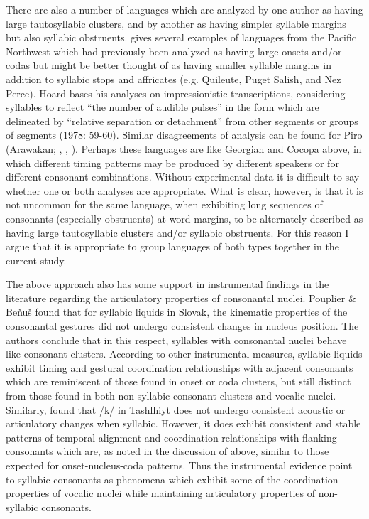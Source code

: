   There are also a number of languages which are analyzed by one author as having large tautosyllabic clusters, and by another as having simpler syllable margins but also syllabic obstruents. \citet{Hoard1978} gives several examples of languages from the Pacific Northwest which had previously been analyzed as having large onsets and/or codas but might be better thought of as having smaller syllable margins in addition to syllabic stops and affricates (e.g. Quileute, Puget Salish, and Nez Perce). Hoard bases his analyses on impressionistic transcriptions, considering syllables to reflect “the number of audible pulses” in the form which are delineated by “relative separation or detachment” from other segments or groups of segments (1978: 59-60). Similar disagreements of analysis can be found for Piro (Arawakan; \citealt{Matteson1965}, \citealt{Lin1997}, \citealt{Hanson2010}). Perhaps these languages are like Georgian and Cocopa above, in which different timing patterns may be produced by different speakers or for different consonant combinations. Without experimental data it is difficult to say whether one or both analyses are appropriate. What is clear, however, is that it is not uncommon for the same language, when exhibiting long sequences of consonants (especially obstruents) at word margins, to be alternately described as having large tautosyllabic clusters and/or syllabic obstruents. For this reason I argue that it is appropriate to group languages of both types together in the current study.



  The above approach also has some support in instrumental findings in the literature regarding the articulatory properties of consonantal nuclei. Pouplier \& Beňuš  found that for syllabic liquids in Slovak, the kinematic properties of the consonantal gestures did not undergo consistent changes in nucleus position. The authors conclude that in this respect, syllables with consonantal nuclei behave like consonant clusters. According to other instrumental measures, syllabic liquids exhibit timing and gestural coordination relationships with adjacent consonants which are reminiscent of those found in onset or coda clusters, but still distinct from those found in both non-syllabic consonant clusters and vocalic nuclei. Similarly, \citet{FougeronRidouane2008} found that /k/ in Tashlhiyt does not undergo consistent acoustic or articulatory changes when syllabic. However, it does exhibit consistent and stable patterns of temporal alignment and coordination relationships with flanking consonants which are, as noted in the discussion of \citet{GoldsteinEtAl2007} above, similar to those expected for onset-nucleus-coda patterns. Thus the instrumental evidence point to syllabic consonants as phenomena which exhibit some of the coordination properties of vocalic nuclei while maintaining articulatory properties of non-syllabic consonants.



